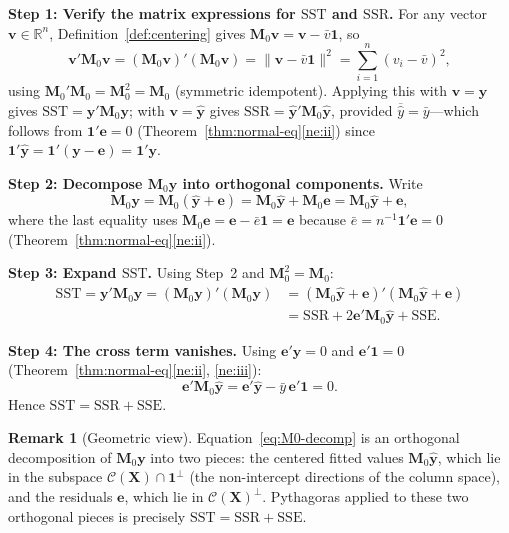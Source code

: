 \documentclass[12pt,a4paper]{article}
\makeatletter
\theoremstyle{definition}
\newtheorem{remark}[theorem]{Remark}
\renewenvironment{proof}[1][\proofname]{\par
  \pushQED{\qed}%
  \normalfont \topsep6\p@\@plus6\p@\relax
  \trivlist
  \item[\hskip\labelsep\bfseries #1\@addpunct{.}]\ignorespaces
}{%
  \popQED\endtrivlist\@endpefalse
}
\newcommand{\SST}{\mathrm{SST}}
\newcommand{\SSR}{\mathrm{SSR}}
\newcommand{\SSE}{\mathrm{SSE}}
\newcommand{\bX}{\mathbf{X}}
\newcommand{\by}{\mathbf{y}}
\newcommand{\bM}{\mathbf{M}}
\newcommand{\bone}{\mathbf{1}}
\newcommand{\bv}{\mathbf{v}}
\newcommand{\Real}{\mathbb{R}}
\newcommand{\calC}{\mathcal{C}}
\makeatother
\begin{document}
\begin{proof}
\textbf{Step 1: Verify the matrix expressions for $\SST$ and $\SSR$.} For any vector $\bv \in \Real^n$, Definition~\ref{def:centering} gives $\bM_0\bv = \bv - \bar{v}\bone$, so
\[
\bv'\bM_0\bv = (\bM_0\bv)'(\bM_0\bv) = \|\bv - \bar{v}\bone\|^2 = \sum_{i=1}^n (v_i - \bar{v})^2,
\]
using $\bM_0'\bM_0 = \bM_0^2 = \bM_0$ (symmetric idempotent). Applying this with $\bv = \by$ gives $\SST = \by'\bM_0\by$; with $\bv = \hat{\by}$ gives $\SSR = \hat{\by}'\bM_0\hat{\by}$, provided $\overline{\hat{y}} = \bar{y}$—which follows from $\bone'\mathbf{e} = 0$ (Theorem~\ref{thm:normal-eq}\ref{ne:ii}) since $\bone'\hat{\by} = \bone'(\by - \mathbf{e}) = \bone'\by$.

\textbf{Step 2: Decompose $\bM_0\by$ into orthogonal components.} Write
\begin{equation}\label{eq:M0-decomp}
\bM_0\by = \bM_0(\hat{\by} + \mathbf{e}) = \bM_0\hat{\by} + \bM_0\mathbf{e} = \bM_0\hat{\by} + \mathbf{e},
\end{equation}
where the last equality uses $\bM_0\mathbf{e} = \mathbf{e} - \bar{e}\bone = \mathbf{e}$ because $\bar{e} = n^{-1}\bone'\mathbf{e} = 0$ (Theorem~\ref{thm:normal-eq}\ref{ne:ii}).

\textbf{Step 3: Expand $\SST$.} Using Step~2 and $\bM_0^2 = \bM_0$:
\begin{align*}
\SST = \by'\bM_0\by = (\bM_0\by)'(\bM_0\by) &= (\bM_0\hat{\by} + \mathbf{e})'(\bM_0\hat{\by} + \mathbf{e})\\
&= \SSR + 2\mathbf{e}'\bM_0\hat{\by} + \SSE.
\end{align*}

\textbf{Step 4: The cross term vanishes.} Using $\mathbf{e}'\hat{\by} = 0$ and $\mathbf{e}'\bone = 0$ (Theorem~\ref{thm:normal-eq}\ref{ne:ii}, \ref{ne:iii}):
\[
\mathbf{e}'\bM_0\hat{\by} = \mathbf{e}'\hat{\by} - \bar{y}\,\mathbf{e}'\bone = 0.
\]
Hence $\SST = \SSR + \SSE$.
\end{proof}

\begin{remark}[Geometric view]\label{rem:geometric}
Equation~\eqref{eq:M0-decomp} is an orthogonal decomposition of $\bM_0\by$ into two pieces: the centered fitted values $\bM_0\hat{\by}$, which lie in the subspace $\calC(\bX) \cap \bone^\perp$ (the non-intercept directions of the column space), and the residuals $\mathbf{e}$, which lie in $\calC(\bX)^\perp$. Pythagoras applied to these two orthogonal pieces is precisely $\SST = \SSR + \SSE$.
\end{remark}
\end{document}
